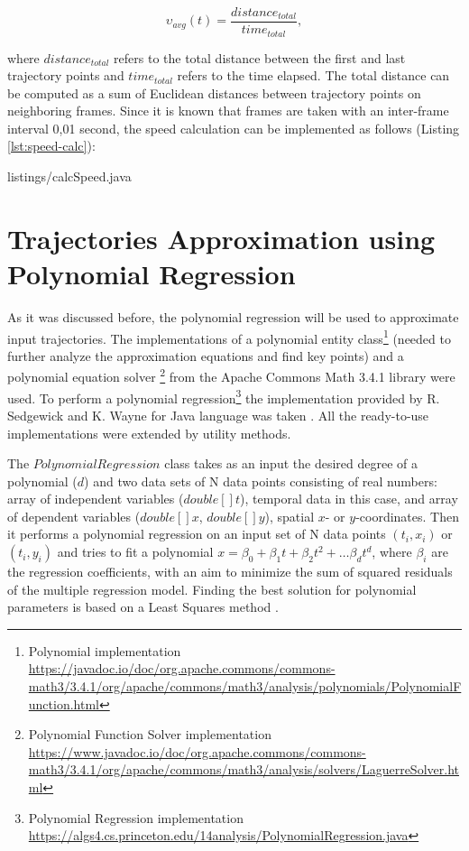 \begin{equation} \label{eq:avg_speed}
\upsilon_{avg}(t) = \frac{distance_{total}} {time_{total}},
\end{equation}

where $distance_{total}$ refers to the total distance between the first and last trajectory points and $time_{total}$ refers to the time elapsed. The total distance can be computed as a sum of Euclidean distances between trajectory points on neighboring frames. Since it is known that frames are taken with an inter-frame interval 0,01 second, the speed calculation can be implemented as follows (Listing \ref{lst:speed-calc}):

\lstset{style=code-style-java}
 {listings/calcSpeed.java}

\section{Trajectories Approximation using Polynomial Regression}

As it was discussed before, the polynomial regression will be used to approximate input trajectories. The implementations of a polynomial entity class\footnote{Polynomial implementation \url{https://javadoc.io/doc/org.apache.commons/commons-math3/3.4.1/org/apache/commons/math3/analysis/polynomials/PolynomialFunction.html}} (needed to further analyze the approximation equations and find key points) and a polynomial equation solver \footnote{Polynomial Function Solver implementation \url{https://www.javadoc.io/doc/org.apache.commons/commons-math3/3.4.1/org/apache/commons/math3/analysis/solvers/LaguerreSolver.html}} from the Apache Commons Math 3.4.1 library were used. To perform a polynomial regression\footnote{Polynomial Regression implementation \url{https://algs4.cs.princeton.edu/14analysis/PolynomialRegression.java}} the implementation provided by R. Sedgewick and K. Wayne for Java language was taken \cite{online:polynomial_impl}. All the ready-to-use implementations were extended by utility methods.

The $PolynomialRegression$ class takes as an input the desired degree of a polynomial ($d$) and two data sets of N data points consisting of real numbers: array of independent variables ($double[] t$), temporal data in this case, and array of dependent variables ($double[] x$, $double[] y$), spatial $x$- or $y$-coordinates. Then it performs a polynomial regression on an input set of N data points $(t_i, x_i)$ or $(t_i, y_i)$ and tries to fit a polynomial $x = \beta_0 + \beta_1t + \beta_2t^2 + \ldots \beta_dt^d$, where $\beta_i$ are the regression coefficients, with an aim to minimize the sum of squared residuals of the multiple regression model. Finding the best solution for polynomial parameters is based on a Least Squares method \cite{article:behav_form_extr}.

